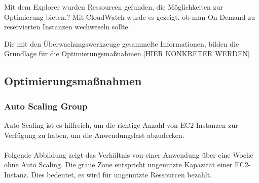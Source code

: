 
Mit dem Explorer wurden Ressourcen gefunden, die Möglichkeiten zur Optimierung bieten.?
Mit CloudWatch wurde es gezeigt, ob man On-Demand zu reservierten Instanzen wechweseln sollte.

Die mit den Überwachungswerkzeuge gesammelte Informationen, bilden die Grundlage für die Optimierungsmaßnahmen.[HIER KONKRETER WERDEN]

\subsection{Optimierungsmaßnahmen}

\subsubsection{Auto Scaling Group }
Auto Scaling ist es hilfreich, um die richtige Anzahl von EC2 Instanzen zur Verfügung zu haben, um die Anwendungslast abzudecken.
\\\\

Folgende Abbildung zeigt das Verhältnis von einer Anwendung über eine Woche ohne Auto Scaling.
Die graue Zone entspricht ungenutzte Kapazität einer EC2-Instanz. Dies bedeutet, es wird für ungenutzte Ressourcen bezahlt.

